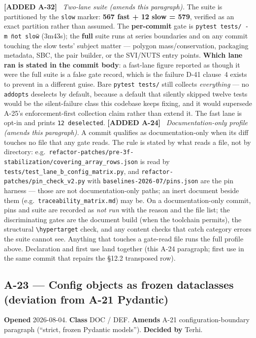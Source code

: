 \documentclass[
  10pt,
]{article}
\newcommand{\amdnew}[1]{{\color{amdcolor}\footnotesize\textbf{[ADDED #1]}}\ }
\begin{document}
\amdnew{A-32} \emph{Two-lane suite (amends this paragraph).} The suite is partitioned by the \texttt{slow} marker: \textbf{567 fast + 12 slow = 579}, verified as an exact partition rather than assumed. The \textbf{per-commit} gate is \texttt{pytest tests/ -m \"not slow\"} (3m43s); the \textbf{full} suite runs at series boundaries and on any commit touching the slow tests' subject matter --- polygon mass/conservation, packaging metadata, SBC, the pair builder, or the SVI/NUTS entry points. \textbf{Which lane ran is stated in the commit body}: a fast-lane figure reported as though it were the full suite is a false gate record, which is the failure D-41 clause~4 exists to prevent in a different guise. Bare \texttt{pytest tests/} still collects \emph{everything} --- no \texttt{addopts} deselects by default, because a default that silently skipped twelve tests would be the silent-failure class this codebase keeps fixing, and it would supersede A-25's enforcement-first collection claim rather than extend it. The fast lane is opt-in and prints \texttt{12 deselected}.
\amdnew{A-24} \emph{Documentation-only profile (amends this paragraph).} A commit qualifies as documentation-only when its diff touches no file that any gate reads. The rule is stated by what reads a file, not by directory: e.g.\ \texttt{refactor-patches/pre-3f-stabilization/covering\_array\_rows.json} is read by \texttt{tests/test\_lane\_b\_config\_matrix.py}, and \texttt{refactor-patches/pin\_check\_v2.py} with \texttt{baselines-2026-07/pins.json} are the pin harness --- those are not documentation-only paths; an inert document beside them (e.g.\ \texttt{traceability\_matrix.md}) may be. On a documentation-only commit, pins and suite are recorded as \emph{not run} with the reason and the file list; the discriminating gates are the document build (when the toolchain permits), the structural \texttt{\textbackslash hypertarget} check, and any content checks that catch category errors the suite cannot see. Anything that touches a gate-read file runs the full profile above. Declaration and first use land together (this A-24 paragraph; first use in the same commit that repairs the §12.2 transposed row).


\hypertarget{a-23}{%
\subsection{A-23 --- Config objects as frozen dataclasses (deviation from A-21 Pydantic)}\label{a-23}}

\textbf{Opened} 2026-08-04. \textbf{Class} DOC / DEF. \textbf{Amends} A-21 configuration-boundary paragraph (``strict, frozen Pydantic models''). \textbf{Decided by} Terhi.
\end{document}
